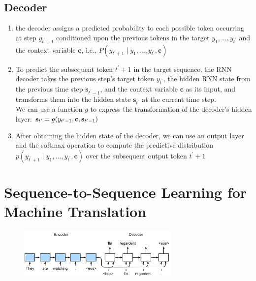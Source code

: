 \subsection{Decoder \cite{dnn-1}} \label{rnn: Decoder}

\begin{enumerate}
    \item the decoder assigns a predicted probability to each possible token occurring at step $y_{t^\prime+1}$ conditioned upon the previous tokens in the target $y_1, \ldots, y_{t^\prime}$ and the context variable $\mathbf{c}$, i.e., $P(y_{t^\prime+1} \mid y_1, \ldots, y_{t^\prime}, \mathbf{c})$

    \item To predict the subsequent token $t^\prime+1$ in the target sequence, the RNN decoder takes the previous step’s target token $y_{t^\prime}$, the hidden RNN state from the previous time step $\mathbf{s}_{t^\prime-1}$, and the context variable $\mathbf{c}$ as its input, and transforms them into the hidden state $\mathbf{s}_{t^\prime}$ at the current time step.\\
    We can use a function $g$ to express the transformation of the decoder’s hidden layer:
    $
        \hfill
        \mathbf{s}_{t^\prime} = g(y_{t^\prime-1}, \mathbf{c}, \mathbf{s}_{t^\prime-1})
        \hfill
    $

    \item After obtaining the hidden state of the decoder, we can use an output layer and the softmax operation to compute the predictive distribution $p(y_{t^{\prime}+1} \mid y_1, \ldots, y_{t^\prime}, \mathbf{c})$ over the subsequent output token ${t^\prime+1}$

    
\end{enumerate}









\section{Sequence-to-Sequence Learning for Machine Translation \cite{dnn-1}}

\begin{figure}[H]
    \centering
    \includegraphics[width=\linewidth, height=2.5cm, keepaspectratio]{Pictures/Recurrent-Neural-Networks/seq2seq-nmt.jpg}
\end{figure}


